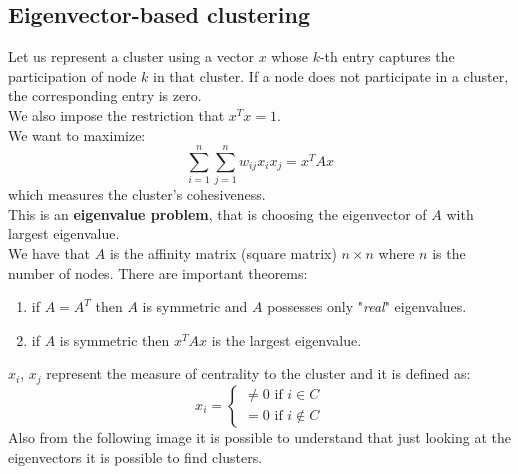 \subsection{Eigenvector-based clustering}
Let us represent a cluster using a vector $x$ whose $k$-th entry captures the participation of node $k$ in that cluster. If a node does not participate in a cluster, the corresponding entry is zero.\\
We also impose the restriction that $x^Tx = 1$.\\
We want to maximize:
$$\sum_{i=1}^n \sum_{j=1}^n w_{ij} x_i x_j = x^TAx$$
which measures the cluster's cohesiveness.\\
This is an \textbf{eigenvalue problem}, that is choosing the eigenvector of $A$ with largest eigenvalue.\\
We have that $A$ is the affinity matrix (square matrix) $n \times n$ where $n$ is the number of nodes. There are important theorems:
\begin{enumerate}
	\item if $A = A^T$ then $A$ is symmetric and $A$ possesses only "\textit{real}" eigenvalues.
	\item if $A$ is symmetric then $x^TAx$ is the largest eigenvalue. 
\end{enumerate}
$x_i$, $x_j$ represent the measure of centrality to the cluster and it is defined as:
$$x_i = \begin{cases}
\neq 0 \text{  if } i \in C\\
= 0 \text{  if } i \notin C
\end{cases}$$
Also from the following image it is possible to understand that just looking at the eigenvectors it is possible to find clusters.

